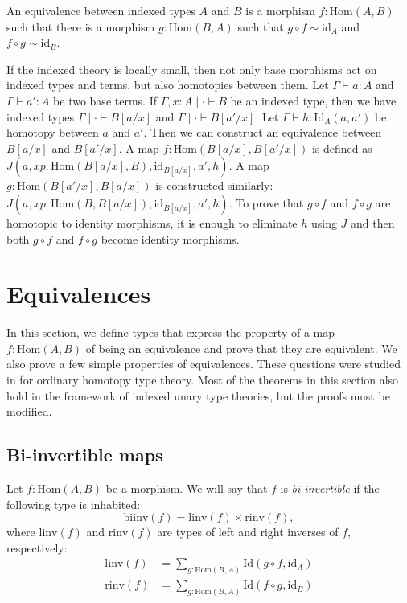 \documentclass[reqno]{amsart}
\theoremstyle{definition}
\theoremstyle{remark}
\newcommand{\ob}{}
\newcommand{\fs}[1]{\mathrm{#1}}
\newcommand{\Hom}{\fs{Hom}}
\newcommand{\Id}{\fs{Id}}
\newcommand{\id}{\fs{id}}
\numberwithin{figure}{section}
\begin{document}
\begin{defn}
An equivalence between indexed types $A$ and $B$ is a morphism $f : \Hom(A,B)$ such that there is a morphism $g : \Hom(B,A)$ such that $g \circ f \sim \id_A$ and $f \circ g \sim \id_B$.
\end{defn}

If the indexed theory is locally small, then not only base morphisms act on indexed types and terms, but also homotopies between them.
Let $\Gamma \vdash a : A$ and $\Gamma \vdash a' : A$ be two base terms.
If $\Gamma, x : A \mid \cdot \vdash B \ob$ be an indexed type, then we have indexed types $\Gamma \mid \cdot \vdash B[a/x] \ob$ and $\Gamma \mid \cdot \vdash B[a'/x] \ob$.
Let $\Gamma \vdash h : \Id_A(a,a')$ be homotopy between $a$ and $a'$.
Then we can construct an equivalence between $B[a/x]$ and $B[a'/x]$.
A map $f : \Hom(B[a/x],B[a'/x])$ is defined as $J(a, x p.\,\Hom(B[a/x],B), \id_{B[a/x]}, a', h)$.
A map $g : \Hom(B[a'/x],B[a/x])$ is constructed similarly: $J(a, x p.\,\Hom(B,B[a/x]), \id_{B[a/x]}, a', h)$.
To prove that $g \circ f$ and $f \circ g$ are homotopic to identity morphisms, it is enough to eliminate $h$ using $J$ and then both $g \circ f$ and $f \circ g$ become identity morphisms.

\section{Equivalences}
\label{sec:equivalence}

In this section, we define types that express the property of a map $f : \Hom(A,B)$ of being an equivalence and prove that they are equivalent.
We also prove a few simple properties of equivalences.
These questions were studied in \cite[Section~4]{hottbook} for ordinary homotopy type theory.
Most of the theorems in this section also hold in the framework of indexed unary type theories, but the proofs must be modified.

\subsection{Bi-invertible maps}

Let $f : \Hom(A,B)$ be a morphism.
We will say that $f$ is \emph{bi-invertible} if the following type is inhabited:
\[ \fs{biinv}(f) = \fs{linv}(f) \times \fs{rinv}(f), \]
where $\fs{linv}(f)$ and $\fs{rinv}(f)$ are types of left and right inverses of $f$, respectively:
\begin{align*}
\fs{linv}(f) & = \sum_{g : \Hom(B,A)} \Id(g \circ f, \id_A) \\
\fs{rinv}(f) & = \sum_{g : \Hom(B,A)} \Id(f \circ g, \id_B)
\end{align*}
\end{document}
